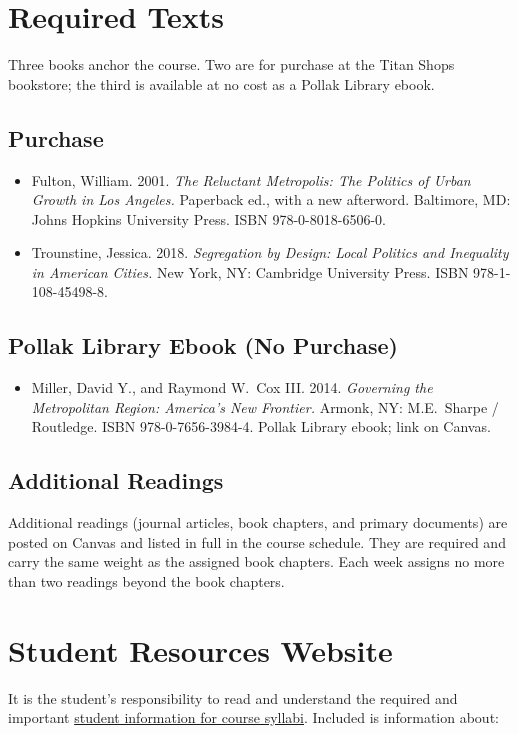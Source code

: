 \documentclass[12pt]{article}
\begin{document}
\section*{Required Texts}

Three books anchor the course. Two are for purchase at the Titan Shops bookstore; the third is available at no cost as a Pollak Library ebook.

\subsection*{Purchase}

\begin{itemize}
    \item Fulton, William. 2001. \emph{The Reluctant Metropolis: The Politics of Urban Growth in Los Angeles.} Paperback ed., with a new afterword. Baltimore, MD: Johns Hopkins University Press. ISBN 978-0-8018-6506-0.
    \item Trounstine, Jessica. 2018. \emph{Segregation by Design: Local Politics and Inequality in American Cities.} New York, NY: Cambridge University Press. ISBN 978-1-108-45498-8.
\end{itemize}

\subsection*{Pollak Library Ebook (No Purchase)}

\begin{itemize}
    \item Miller, David Y., and Raymond W.\ Cox III. 2014. \emph{Governing the Metropolitan Region: America's New Frontier.} Armonk, NY: M.E.\ Sharpe / Routledge. ISBN 978-0-7656-3984-4. Pollak Library ebook; link on Canvas.
\end{itemize}

\subsection*{Additional Readings}

Additional readings (journal articles, book chapters, and primary documents) are posted on Canvas and listed in full in the course schedule. They are required and carry the same weight as the assigned book chapters. Each week assigns no more than two readings beyond the book chapters.

\section*{Student Resources Website}
It is the student's responsibility to read and understand the required and important \href{https://fdc.fullerton.edu/teaching/student-info-syllabi.html}{student information for course syllabi}. Included is information about:
\end{document}
